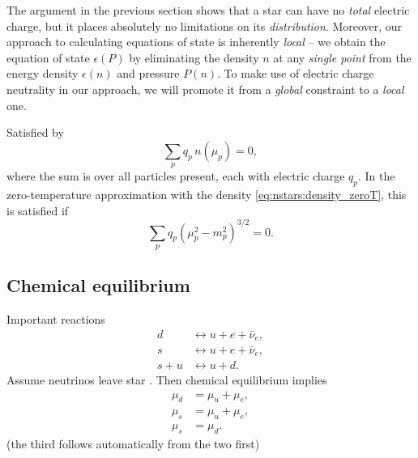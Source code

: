 

The argument in the previous section shows that a star can have no \emph{total} electric charge, but it places absolutely no limitations on its \emph{distribution}.
Moreover, our approach to calculating equations of state is inherently \emph{local} -- we obtain the equation of state $\epsilon(P)$ by eliminating the density $n$ at any \emph{single point} from the energy density $\epsilon(n)$ and pressure $P(n)$.
To make use of electric charge neutrality in our approach, we will promote it from a \emph{global} constraint to a \emph{local} one.




Satisfied by
\begin{equation}
	\sum_p q_p \, n(\mu_p) = 0 ,
\label{eq:lsm:charge_neutrality}
\end{equation}
where the sum is over all particles present, each with electric charge $q_p$.
In the zero-temperature approximation with the density \eqref{eq:nstars:density_zeroT}, this is satisfied if
\begin{equation}
	\sum_p q_p \left( \mu_p^2 - m_p^2 \right)^{3/2} = 0 .
\end{equation}

\subsection{Chemical equilibrium}


Important reactions
\begin{subequations}
\begin{align}
	d     &\leftrightarrow u + e + \bar{\nu}_e, \\
	s     &\leftrightarrow u + e + \bar{\nu}_e, \\
	s + u &\leftrightarrow u + d .
\end{align}
\end{subequations}
Assume neutrinos leave star .
Then chemical equilibrium implies
\begin{subequations}
\begin{align}
	\mu_d &= \mu_u + \mu_e, \\
	\mu_s &= \mu_u + \mu_e, \\
	\mu_s &= \mu_d .
\end{align}
\label{eq:lsm:chemical_equilibrium}
\end{subequations}
(the third follows automatically from the two first)

